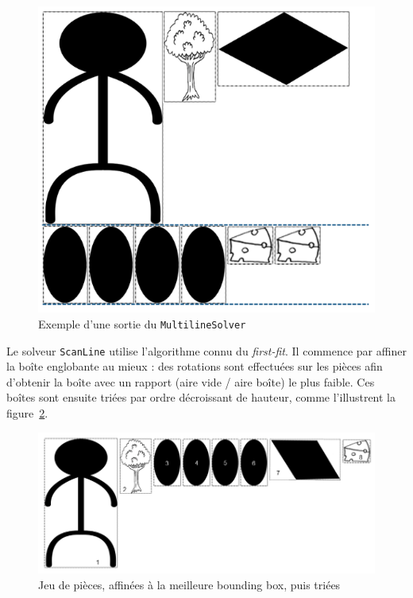 \begin{figure}[!htb]
\centering
\includegraphics[scale=0.6]{img/multilineSolver.png}
\caption{Exemple d'une sortie du \texttt{MultilineSolver}}
\label{fig:multilineSolver}
\end{figure}

Le solveur \texttt{ScanLine} utilise l'algorithme connu du \textit{first-fit}. Il commence par affiner la boîte englobante au mieux : des rotations sont effectuées sur les pièces afin d'obtenir la boîte avec un rapport (aire vide / aire boîte) le plus faible. Ces boîtes sont ensuite triées par ordre décroissant de hauteur, comme l'illustrent la figure~\ref{fig:ScanlineA}.

\begin{figure}[!htb]
\centering
\includegraphics[scale=0.6]{img/ScanlineA.png}
\caption{Jeu de pièces, affinées à la meilleure bounding box, puis triées}
\label{fig:ScanlineA}
\end{figure}

